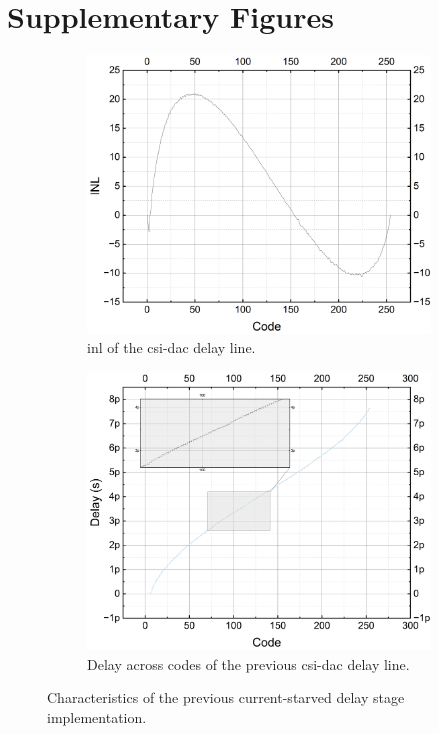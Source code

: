 \section{Supplementary Figures}
\label{app:supp_figures}

\begin{figure}[htbp]
  \centering
  \begin{subfigure}{0.4\linewidth}
    \centering
    \includegraphics[width=\linewidth]{figures/Results/Previous Implementation-INL.png}
    \caption{\gls{inl} of the \gls{csi}-\gls{dac} delay line.}
    \label{fig:current_starved_dac_inl}
  \end{subfigure}
  \hfill
  \begin{subfigure}{0.4\linewidth}
    \centering
    \includegraphics[width=\linewidth]{figures/Results/Previous Implementation-DelayAcrossCodesWithZoomIN.png}
    \caption{Delay across codes of the previous \gls{csi}-\gls{dac} delay line.}
    \label{fig:current_starved_dac_delay_range}
  \end{subfigure}
  \caption{Characteristics of the previous current-starved delay stage implementation.}
\end{figure}

